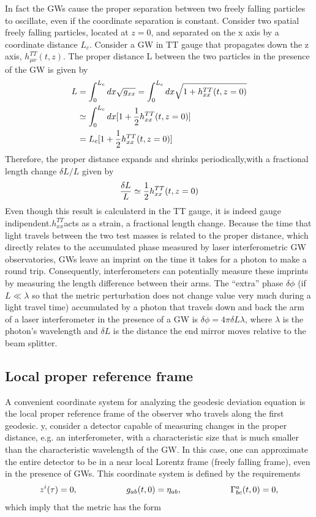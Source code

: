 \documentclass[binding=0.6cm, LaM]{sapthesis}
\begin{document}
In fact the GWs cause the
proper separation between two freely falling particles to oscillate, even if the coordinate
separation is constant. Consider two spatial freely falling particles, located at $z = 0$, and separated on the x axis by a coordinate distance $L_c$. Consider a GW in TT gauge that propagates down the z axis, $h^{TT}_{\mu\nu}(t,z)$. The proper distance L between the two particles in the presence of the GW is given by
\begin{align}
L & = \int^{L_c}_{0}{dx\sqrt{g_{xx}}} = \int^{L_c}_{0}dx\sqrt{1 + h^{TT}_{xx}(t,z=0)} \\
 & \simeq \int^{L_c}_{0}{dx[1 + {1 \over 2}h^{TT}_{xx}(t,z=0)]} \\
&= L_c[1 + {1 \over 2}h^{TT}_{xx}(t,z=0)]
\end{align}
Therefore, the proper distance expands and shrinks periodically,with a fractional length change $\delta L/L$ given by
\begin{equation}
{{\delta L}\over{L}} \simeq {1 \over 2} h_{xx}^{TT}(t,z=0)
\end{equation}
Even though this result is calculaterd in the TT gauge, it is indeed gauge indipendent.$h_{xx}^{TT}$acts as a strain, a fractional length change.
 Because the time that light travels between the two test masses is related to the proper distance,  which directly relates to the accumulated phase measured by laser interferometric GW observatories, GWs leave an imprint on the time it takes for a photon to make a round trip. Consequently, interferometers can potentially measure these imprints by measuring the length difference between their arms. The “extra” phase $\delta \phi$ (if $L \ll \lambda$ so that the metric perturbation does not change value very much during a light travel time) accumulated by a photon that travels down and back the arm of a laser interferometer in the presence of a GW is $\delta \phi = 4\pi \delta L \lambda$, where $\lambda$ is the photon’s wavelength and $\delta L$ is the distance the end mirror moves relative to the beam splitter. 

\subsection{Local proper reference frame}

A convenient coordinate system for analyzing the geodesic deviation equation is the local proper reference frame of the observer who travels along the first geodesic. y, consider a detector capable of measuring changes in the proper distance, e.g. an interferometer, with a characteristic size that is much smaller than the characteristic wavelength of the GW. In this case, one can approximate the entire detector to be in a near local Lorentz frame  (freely falling frame), even in the presence of GWs. This coordinate system is defined by the requirements
\begin{equation}
z^i(\tau) = 0, \hspace*{2cm} g_{ab}(t, 0) = \eta_{ab}, \hspace*{2cm} \Gamma^a_{bc}(t,0) = 0,
\end{equation}
which imply that the metric has the form
\end{document}

